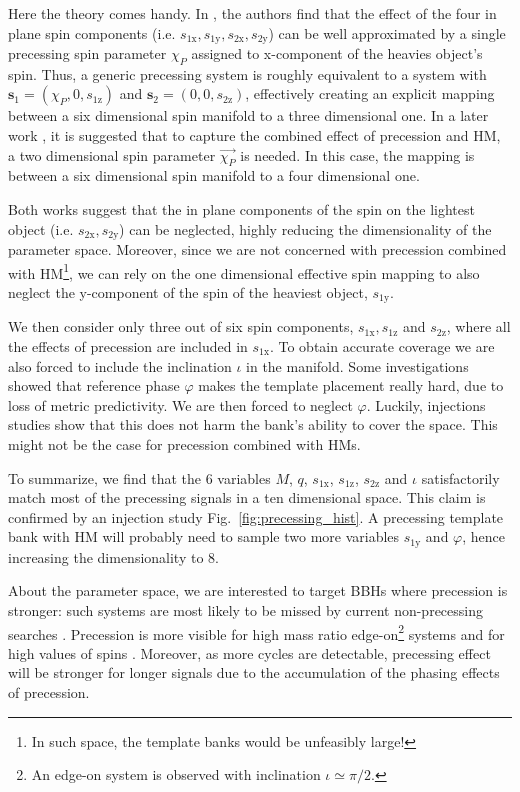 \documentclass[twocolumn,showpacs,preprintnumbers,nofootinbib,prd,
superscriptaddress,10pt]{revtex4-2}
\begin{document}
Here the theory comes handy. In \cite{Schmidt:2014iyl}, the authors find that the effect of the four in plane spin components (i.e. $s_\text{1x}, s_\text{1y}, s_\text{2x}, s_\text{2y}$) can be well approximated by a single precessing spin parameter $\chi_P$ assigned to x-component of the heavies object's spin.
Thus, a generic precessing system is roughly equivalent to a system with $\mathbf{s}_\text{1} = (\chi_P, 0, s_\text{1z})$ and $\mathbf{s}_\text{2} = (0, 0, s_\text{2z})$, effectively creating an explicit mapping between a six dimensional spin manifold to a three dimensional one.
In a later work \cite{Thomas:2020uqj}, it is suggested that to capture the combined effect of precession and HM, a two dimensional spin parameter $\vec{\chi_P}$ is needed. In this case, the mapping is between  a six dimensional spin manifold to a four dimensional one.

Both works suggest that the in plane components of the spin on the lightest object (i.e. $s_\text{2x}, s_\text{2y}$) can be neglected, highly reducing the dimensionality of the parameter space.
Moreover, since we are not concerned with precession combined with HM\footnote{In such space, the template banks would be unfeasibly large!}, we can rely on the one dimensional effective spin mapping \cite{Schmidt:2014iyl} to also neglect the y-component of the spin of the heaviest object, $s_\text{1y}$.

We then consider only three out of six spin components, $s_\text{1x}, s_\text{1z}$ and $s_\text{2z}$, where all the effects of precession are included in $s_\text{1x}$. To obtain accurate coverage we are also forced to include the inclination $\iota$ in the manifold. Some investigations showed that reference phase $\varphi$ makes the template placement really hard, due to loss of metric predictivity.
We are then forced to neglect $\varphi$. Luckily, injections studies show that this does not harm the bank's ability to cover the space. This might not be the case for precession combined with HMs.

To summarize, we find that the $6$ variables $M$, $q$, $s_\text{1x}$, $s_\text{1z}$, $s_\text{2z}$ and $\iota$ satisfactorily match most of the precessing signals in a ten dimensional space.
This claim is confirmed by an injection study Fig.~\ref{fig:precessing_hist}.
A precessing template bank with HM will probably need to sample two more variables $s_\text{1y}$ and $\varphi$, hence increasing the dimensionality to $8$.

About the parameter space, we are interested to target BBHs where precession is stronger: such systems are most likely to be missed by current non-precessing searches \cite{PhysRevD.102.041302, Fairhurst:2019vut}.
Precession is more visible for high mass ratio edge-on\footnote{An edge-on system is observed with inclination $\iota\simeq \pi/2$.} systems and for high values of spins \cite{CalderonBustillo:2016rlt}. Moreover, as more cycles are detectable, precessing effect will be stronger for longer signals due to the accumulation of the phasing effects of precession.
\end{document}
